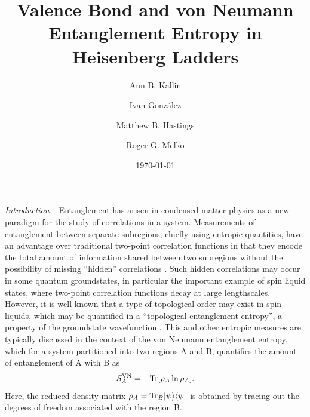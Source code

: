 \documentclass[prl,aps,twocolumn,floatfix,amsmath,amssymb,superscriptaddress,tightenlines]{revtex4}
\begin{document}
\date{\today}
\title{Valence Bond and von Neumann Entanglement Entropy in Heisenberg Ladders}
\author{Ann B. Kallin}

\author{Ivan Gonz\'alez}

\author{Matthew B. Hastings}

\author{Roger G. Melko}

\begin{abstract}

\end{abstract}
\maketitle


{\it Introduction.}-- Entanglement has arisen in condensed matter physics as a new paradigm for the study of correlations in a system.  Measurements of entanglement between separate subregions, chiefly using entropic quantities, have an advantage over traditional two-point correlation functions in that they encode the total amount of information shared between two subregions without the possibility of missing ``hidden'' correlations \cite{wolf}.  Such hidden correlations may occur in some quantum groundstates,  in particular the important example of spin liquid states, where two-point correlation functions decay at large lengthscales.  However, it is well known that a type of topological order may exist in spin liquids, which may be quantified in a ``topological entanglement entropy'', a property of the groundstate wavefunction \cite{ KP, LW}.  This and other entropic measures are typically discussed in the context of the von Neumann entanglement entropy, which for a system partitioned into two regions A and B, quantifies the amount of entanglement of A with B as
\begin{equation}
S^{\rm VN}_A = - {\rm Tr} [ \rho_A \ln \rho_A ].
\end{equation}
Here, the reduced density matrix $\rho_A = {\rm Tr}_B | \psi \rangle \langle \psi |$ is obtained by tracing out the degrees of freedom associated with the region B.
\end{document}
